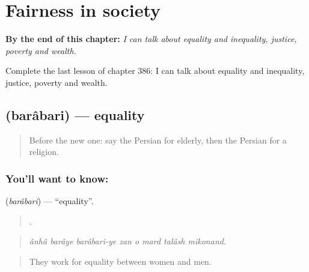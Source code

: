 
\chapter{Fairness in society}
\label{ch:fa-fairness-in-society}

\begin{chapteropening}
\textbf{By the end of this chapter:} \emph{I can talk about equality and inequality, justice, poverty and wealth.}

Complete the last lesson of chapter 386: I can talk about equality and inequality, justice, poverty and wealth.
\end{chapteropening}

\section[\texorpdfstring{\fa{برابری} (barâbari)}{برابری (barâbari)}]{ (barâbari) — equality}

\label{lesson:FA-C386-barabari}



\begin{quote}
Before the new one: say the Persian for elderly, then the Persian for a religion.
\end{quote}

\subsection*{You'll want to know: }
\textbf{} (\emph{barâbari}) — \textquotedblleft{}equality\textquotedblright{}.

\begin{quote}
       .
\end{quote}

\begin{quote}
\emph{ânhâ barâye barâbari-ye zan o mard talâsh mikonand.}
\end{quote}

\begin{quote}
They work for equality between women and men.
\end{quote}

